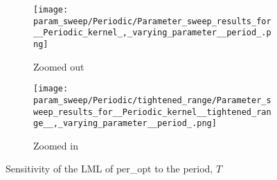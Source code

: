 \begin{figure}
    \centering
    \begin{subfigure}{0.45\textwidth}
        \centering
        \texttt{[image: param\_sweep/Periodic/Parameter\_sweep\_results\_for\_\_Periodic\_kernel\_,\_varying\_parameter\_\_period\_.png]}
        \caption{Zoomed out}
        \label{fig:per sensitivity zoomed out}
    \end{subfigure}
    \begin{subfigure}{0.45\textwidth}
        \centering
        \texttt{[image: param\_sweep/Periodic/tightened\_range/Parameter\_sweep\_results\_for\_\_Periodic\_kernel\_\_tightened\_range\_\_,\_varying\_parameter\_\_period\_.png]}
        \caption{Zoomed in}
        \label{fig:per sensitivity zoomed in}
    \end{subfigure}

    \caption{Sensitivity of the LML of per\_opt to the period, $T$}
    \label{fig:per sensitivity}
\end{figure}
